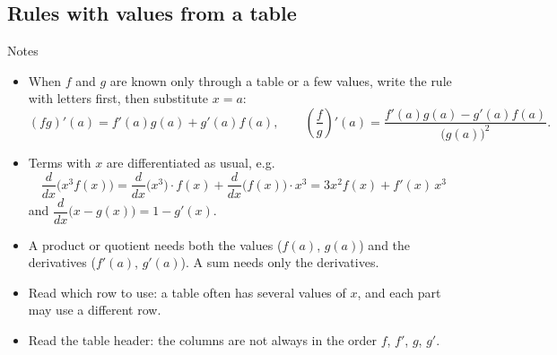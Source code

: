 \documentclass[11pt,a4paper]{article}
\newcommand{\steph}[1]{\par\addvspace{7pt}{\bfseries #1}\par\nobreak\vspace{2pt}}
\begin{document}
\subsection{Rules with values from a table}
\begin{notesbox}{Notes}
\begin{itemize}
 \item When $f$ and $g$ are known only through a table or a few values, write the rule with letters first, then substitute $x=a$:
 \[
 (fg)'(a)=f'(a)g(a)+g'(a)f(a),\qquad \left(\frac fg\right)'(a)=\frac{f'(a)g(a)-g'(a)f(a)}{\bigl(g(a)\bigr)^2}.
 \]
 \item Terms with $x$ are differentiated as usual, e.g.
 \[
 \frac{d}{dx}\bigl(x^3f(x)\bigr)=\frac{d}{dx}\bigl(x^3\bigr)\cdot f(x)+\frac{d}{dx}\bigl(f(x)\bigr)\cdot x^3=3x^2f(x)+f'(x)\,x^3
 \]
 and $\dfrac{d}{dx}\bigl(x-g(x)\bigr)=1-g'(x)$.
 \item A product or quotient needs both the values ($f(a)$, $g(a)$) and the derivatives ($f'(a)$, $g'(a)$). A sum needs only the derivatives.
 \item Read which row to use: a table often has several values of $x$, and each part may use a different row.
\end{itemize}
\steph{Trap.}
\begin{itemize}
 \item Read the table header: the columns are not always in the order $f$, $f'$, $g$, $g'$.
\end{itemize}
\end{notesbox}
\end{document}

